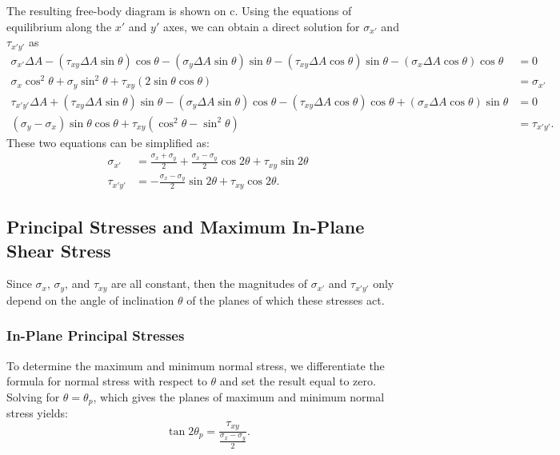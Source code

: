 The resulting free-body diagram is shown on c.
Using the equations of equilibrium along the $x'$ and $y'$ axes, we can obtain a direct solution for $\sigma_{x'}$ and $\tau_{x'y'}$ as
\begin{align*}
  \sigma_{x'}\Delta A - \left( \tau_{xy} \Delta A \sin \theta \right) \cos \theta - \left( \sigma_y \Delta A \sin \theta \right) \sin \theta - \left( \tau_{xy} \Delta A \cos \theta \right) \sin \theta - \left( \sigma_x \Delta A \cos \theta \right) \cos \theta &= 0 \\
  \sigma_x \cos^2 \theta + \sigma_y \sin^2 \theta + \tau_{xy} \left( 2 \sin \theta \cos \theta\right) &= \sigma_{x'} \\
  \tau_{x'y'} \Delta A + \left( \tau_{xy} \Delta A \sin \theta \right) \sin \theta - \left( \sigma_y \Delta A \sin \theta \right) \cos \theta - \left( \tau_{xy} \Delta A \cos \theta \right) \cos \theta + \left( \sigma_x \Delta A \cos \theta \right) \sin \theta &= 0 \\
  \left( \sigma_y - \sigma_x \right) \sin \theta \cos \theta + \tau_{xy} \left( \cos^2\theta - \sin^2 \theta \right) &= \tau_{x'y'}
.\end{align*}
These two equations can be simplified as:
\begin{align*}
  \sigma_{x'} &= \frac{\sigma_x + \sigma_y}{2} + \frac{\sigma_x - \sigma_y}{2} \cos 2\theta + \tau_{xy} \sin 2\theta \\
  \tau_{x'y'} &= - \frac{\sigma_x - \sigma_y}{2} \sin 2 \theta + \tau_{xy} \cos 2\theta
.\end{align*}

\subsection{Principal Stresses and Maximum In-Plane Shear Stress}
Since $\sigma_x$, $\sigma_y$, and $\tau_{xy}$ are all constant, then the magnitudes of $\sigma_{x'}$ and $\tau_{x'y'}$ only depend on the angle of inclination $\theta$ of the planes of which these stresses act.

\subsubsection{In-Plane Principal Stresses}
To determine the maximum and minimum normal stress, we differentiate the formula for normal stress with respect to $\theta$ and set the result equal to zero.
Solving for $\theta = \theta_p$, which gives the planes of maximum and minimum normal stress yields:
\begin{equation*}
  \tan 2\theta_p = \frac{\tau_{xy}}{\frac{ \sigma_x - \sigma_y}{2}}
.\end{equation*}

